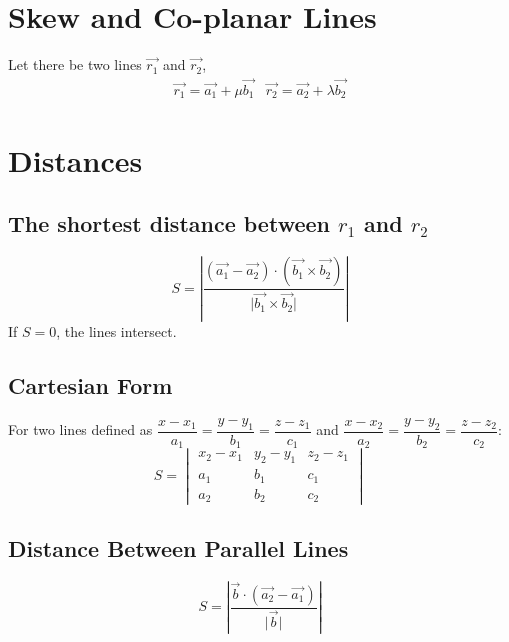 \documentclass[openany, oneside]{book}
\begin{document}
\section{Skew and Co-planar Lines}
Let there be two lines $\vec{r_1}$ and $\vec{r_2}$,
\begin{equation}
\begin{split}
\vec{r_1}=\vec{a_1}+\mu \vec{b_1} & \vec{r_2}=\vec{a_2}+\lambda \vec{b_2}
\end{split}
\end{equation}

\section{Distances}
\subsection{The shortest distance between $r_1$ and $r_2$\newline}
\begin{equation}
S=\left\lvert \dfrac{(\vec{a_1}-\vec{a_2})\cdot (\vec{b_1}\times\vec{b_2})}{\lvert \vec{b_1}\times\vec{b_2} \rvert}\right\rvert
\end{equation}
If $S=0$, the lines intersect.

\subsection{Cartesian Form\newline}
For two lines defined as $\dfrac{x-x_1}{a_1}=\dfrac{y-y_1}{b_1}=\dfrac{z-z_1}{c_1}$ and $\dfrac{x-x_2}{a_2}=\dfrac{y-y_2}{b_2}=\dfrac{z-z_2}{c_2}$:
\begin{equation}
S=\begin{vmatrix}
x_2-x_1&y_2-y_1&z_2-z_1\\
a_1&b_1&c_1\\
a_2&b_2&c_2
\end{vmatrix}
\end{equation}

\subsection{Distance Between Parallel Lines\newline}
\begin{equation}
S=\left| \dfrac{\vec{b}\cdot(\vec{a_2}-\vec{a_1})}{\lvert \vec{b} \rvert} \right|
\end{equation}
\end{document}
